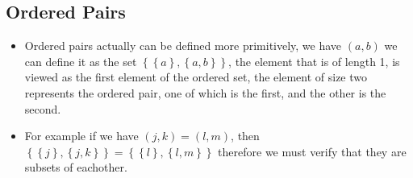 \documentclass[11pt]{book}
\begin{document}
\subsection{Ordered Pairs}%
\label{sub:ordered_pairs}

\begin{itemize}
    \item Ordered pairs actually can be defined more primitively, we have $\left( a,b  \right) $ we can define it as the set $\left\{ \left\{ a \right\} , \left\{ a, b \right\}  \right\} $, the element that is of length 1, is viewed as the first element of the ordered set, the element of size two represents the ordered pair, one of which is the first, and the other is the second. 
    \item For example if we have $\left( j, k  \right) = \left( l, m \right)$, then $\left\{ \left\{ j \right\} , \left\{ j, k \right\}  \right\} = \left\{ \left\{ l \right\} , \left\{ l, m \right\}  \right\} $ therefore we must verify that they are subsets of eachother. 
\end{itemize}





\end{document}
